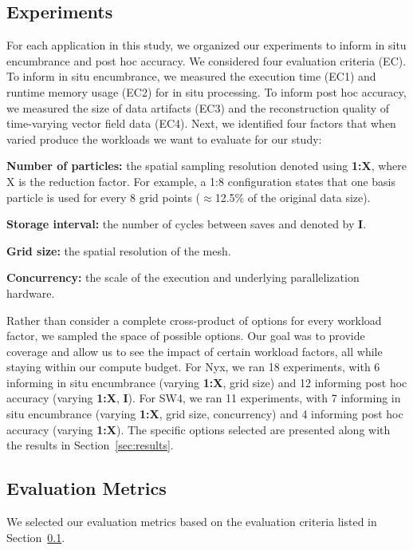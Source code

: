 %
\vspace{-1mm}
\subsection{Experiments}
\label{sec:experiments}

For each application in this study, we organized our experiments to inform in situ encumbrance and post hoc accuracy. 
%
We considered four evaluation criteria (EC).
%
To inform in situ encumbrance,  we measured the execution time (EC1) and runtime memory usage (EC2) for in situ processing.
%
To inform post hoc accuracy, we measured the size of data artifacts (EC3) and the reconstruction quality of time-varying vector field data (EC4).
%
Next, we identified four factors that when varied produce the workloads we want to evaluate for our study:
\begin{tightItemize}
\item\textbf{Number of particles:} the spatial sampling resolution denoted using \textbf{1:X}, where X is the reduction factor. For example, a 1:8 configuration states that one basis particle is used for every 8 grid points ($\approx$12.5\% of the original data size).  
\item\textbf{Storage interval:} the number of cycles between saves and denoted by \textbf{I}.
\item\textbf{Grid size:} the spatial resolution of the mesh. 
\item\textbf{Concurrency:} the scale of the execution and underlying parallelization hardware.
\end{tightItemize}
%
Rather than consider a complete cross-product of options for every workload factor, we sampled the space of possible options.
%
Our goal was to provide coverage and allow us to see the impact of certain workload factors, all while staying within our compute budget.
%
For Nyx, we ran 18 experiments, with 6 informing in situ encumbrance (varying \textbf{1:X}, grid size) and 12 informing post hoc accuracy (varying \textbf{1:X}, \textbf{I}).
%
For SW4, we ran 11 experiments, with 7 informing in situ encumbrance (varying \textbf{1:X}, grid size, concurrency) and 4 informing post hoc accuracy (varying \textbf{1:X}).
%
The specific options selected are presented along with the results in Section~\ref{sec:results}. 

\vspace{-1mm}
\subsection{Evaluation Metrics}
\label{sec:metrics}
We selected our evaluation metrics based on the evaluation criteria listed in Section~\ref{sec:experiments}.
%

